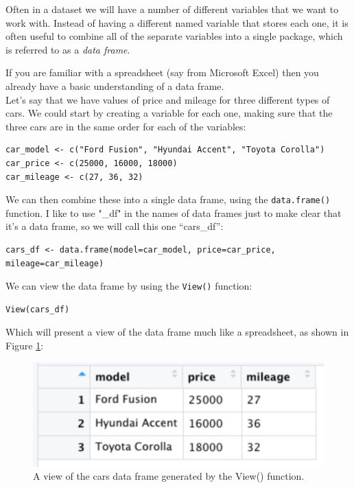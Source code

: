 \documentclass[12pt,]{book}
\begin{document}
Often in a dataset we will have a number of different variables that we want to work with. Instead of having a different named variable that stores each one, it is often useful to combine all of the separate variables into a single package, which is referred to as a \emph{data frame}.

If you are familiar with a spreadsheet (say from Microsoft Excel) then you already have a basic understanding of a data frame.\\
Let's say that we have values of price and mileage for three different types of cars. We could start by creating a variable for each one, making sure that the three cars are in the same order for each of the variables:

\begin{verbatim}
car_model <- c("Ford Fusion", "Hyundai Accent", "Toyota Corolla")
car_price <- c(25000, 16000, 18000)
car_mileage <- c(27, 36, 32)
\end{verbatim}

We can then combine these into a single data frame, using the \texttt{data.frame()} function. I like to use "\_df" in the names of data frames just to make clear that it's a data frame, so we will call this one ``cars\_df'':

\begin{verbatim}
cars_df <- data.frame(model=car_model, price=car_price, mileage=car_mileage)
\end{verbatim}

We can view the data frame by using the \texttt{View()} function:

\begin{verbatim}
View(cars_df)
\end{verbatim}

Which will present a view of the data frame much like a spreadsheet, as shown in Figure \ref{fig:carsDf}:

\begin{figure}
\includegraphics[width=5.11in]{images/cars_df} \caption{A view of the cars data frame generated by the View() function.}\label{fig:carsDf}
\end{figure}
\end{document}
